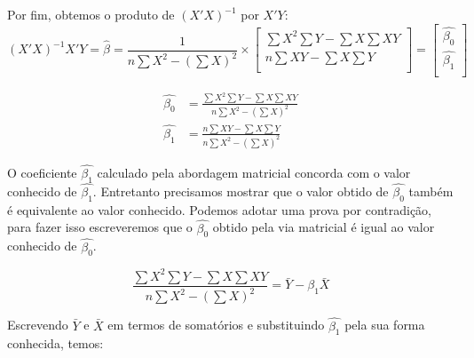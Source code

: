 \documentclass[]{ufpe-exercises}
\begin{document}
\begin{questions}
\begin{solution}
		Por fim, obtemos o produto de \((X'X)^{-1}\) por \(X'Y\):
		\[(X'X)^{-1}X'Y = \hat{\beta} =
			\frac{1}{n \sum X^{2} - (\sum X)^{2}} \times
			\begin{bmatrix}
				\sum X^{2}\sum Y - \sum X\sum XY \\
				n\sum XY - \sum X\sum Y          \\
			\end{bmatrix} =
			\begin{bmatrix}
				\hat{\beta_{0}} \\
				\hat{\beta_{1}} \\
			\end{bmatrix}
		\]

		\begin{align*}
			\hat{\beta_{0}} & = \frac{\sum X^{2}\sum Y - \sum X\sum XY}{n \sum X^{2} - (\sum X)^{2}} \\
			\hat{\beta_{1}} & = \frac{n\sum XY - \sum X\sum Y}{n \sum X^{2} - (\sum X)^{2}}
		\end{align*}

		O coeficiente \(\hat{\beta_{1}}\) calculado pela abordagem matricial concorda com o valor conhecido de \(\hat{\beta_{1}}\). Entretanto precisamos mostrar que o valor obtido de \(\hat{\beta_{0}}\) também é equivalente ao valor conhecido. Podemos adotar uma prova por contradição, para fazer isso escreveremos que o \(\hat{\beta_{0}}\) obtido pela via matricial é igual ao valor conhecido de \(\hat{\beta_{0}}\).

		\[ \frac{\sum X^{2}\sum Y - \sum X\sum XY}{n\sum X^{2} - (\sum X)^{2}} = \bar{Y} - \hat{\beta_{1}}\bar{X} \]

		Escrevendo \(\bar{Y}\) e \(\bar{X}\) em termos de somatórios e substituindo \(\hat{\beta_{1}}\) pela sua forma conhecida, temos:


\end{solution}
\end{questions}
\end{document}
